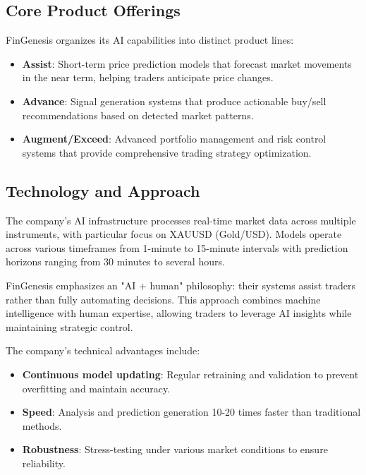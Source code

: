 \subsection*{Core Product Offerings}

FinGenesis organizes its AI capabilities into distinct product lines:

\begin{itemize}
    \item \textbf{Assist}: Short-term price prediction models that forecast market movements in the near term, helping traders anticipate price changes.
    
    \item \textbf{Advance}: Signal generation systems that produce actionable buy/sell recommendations based on detected market patterns.
    
    \item \textbf{Augment/Exceed}: Advanced portfolio management and risk control systems that provide comprehensive trading strategy optimization.
\end{itemize}

\subsection*{Technology and Approach}

The company's AI infrastructure processes real-time market data across multiple instruments, with particular focus on XAUUSD (Gold/USD). Models operate across various timeframes from 1-minute to 15-minute intervals with prediction horizons ranging from 30 minutes to several hours.

FinGenesis emphasizes an "AI + human" philosophy: their systems assist traders rather than fully automating decisions. This approach combines machine intelligence with human expertise, allowing traders to leverage AI insights while maintaining strategic control.

The company's technical advantages include:

\begin{itemize}
    \item \textbf{Continuous model updating}: Regular retraining and validation to prevent overfitting and maintain accuracy.
    \item \textbf{Speed}: Analysis and prediction generation 10-20 times faster than traditional methods.
    \item \textbf{Robustness}: Stress-testing under various market conditions to ensure reliability.
\end{itemize}

